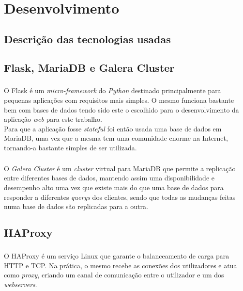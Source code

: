 \documentclass{report}
\begin{document}
\chapter{Desenvolvimento}\label{Desensolvimento}

\section{Descrição das tecnologias usadas}

\section{Flask, MariaDB e Galera Cluster}
\paragraph{}
O Flask é um \emph{micro-framework} do \emph{Python} destinado principalmente para pequenas aplicações com requisitos mais simples. O mesmo funciona bastante bem com bases de dados tendo sido este o escolhido para o desenvolvimento da aplicação \emph{web} para este trabalho.\\
Para que a aplicação fosse \emph{stateful} foi então usada uma base de dados em MariaDB, uma vez que a mesma tem uma comunidade enorme na Internet, tornando-a bastante simples de ser utilizada.

\paragraph{}
O \emph{Galera Cluster} é um \emph{cluster} virtual para MariaDB que permite a replicação entre diferentes bases de dados, mantendo assim uma disponibilidade e desempenho alto uma vez que existe mais do que uma base de dados para responder a diferentes \emph{querys} dos clientes, sendo que todas as mudanças feitas numa base de dados são replicadas para a outra.


\section{HAProxy}
\paragraph{}
O HAProxy é um serviço Linux que garante o balanceamento de carga para HTTP e TCP. Na prática, o mesmo recebe as conexões dos utilizadores e atua como \emph{proxy}, criando um canal de comunicação entre o utilizador e um dos \emph{webservers}.
\end{document}
